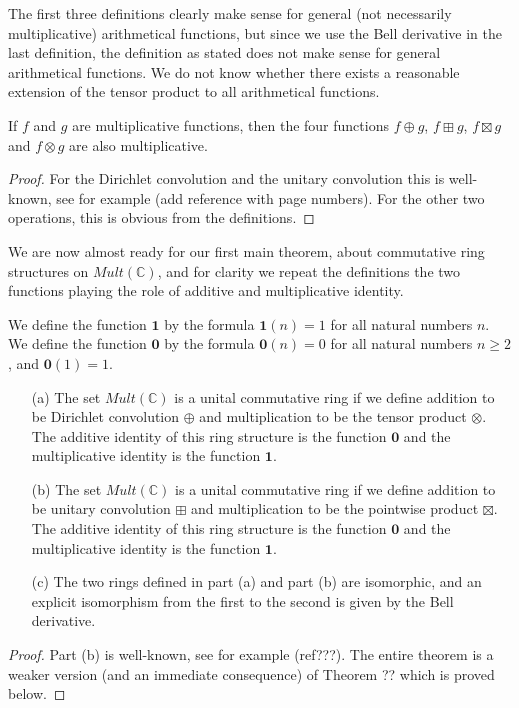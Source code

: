 \documentclass[a4paper]{article}
\begin{document}
\begin{remark}
The first three definitions clearly make sense for general (not necessarily multiplicative) arithmetical functions, but since we use the Bell derivative in the last definition, the definition as stated does not make sense for general arithmetical functions. We do not know whether there exists a reasonable extension of the tensor product to all arithmetical functions.
\end{remark}

\begin{proposition}
If $f$ and $g$ are multiplicative functions, then the four functions $f \oplus g$, $f \boxplus g$, $f \boxtimes g$ and $f \otimes g$ are also multiplicative. 
\end{proposition}

\begin{proof}
For the Dirichlet convolution and the unitary convolution this is well-known, see for example (add reference with page numbers). For the other two operations, this is obvious from the definitions.
\end{proof}

We are now almost ready for our first main theorem, about commutative ring structures on $Mult(\mathbb{C})$, and for clarity we repeat the definitions the two functions playing the role of additive and multiplicative identity.

\begin{definition}
We define the function $\mathbf{1}$ by the formula $\mathbf{1}(n) = 1$ for all natural numbers $n$. We define the function $\mathbf{0}$ by the formula $\mathbf{0}(n) = 0$ for all natural numbers $n \geq 2$, and $\mathbf{0}(1) = 1$.
\end{definition}



\begin{theorem}
\begin{itemize}
\item[(a)] The set $Mult(\mathbb{C})$ is a unital commutative ring if we define addition to be Dirichlet convolution $\oplus$ and multiplication to be the tensor product $\otimes$. The additive identity of this ring structure is the function $\mathbf{0}$ and the multiplicative identity is the function $\mathbf{1}$. 
\item[(b)] The set $Mult(\mathbb{C})$ is a unital commutative ring if we define addition to be unitary convolution $\boxplus$ and multiplication to be the pointwise product $\boxtimes$. The additive identity of this ring structure is the function $\mathbf{0}$ and the multiplicative identity is the function $\mathbf{1}$.
\item[(c)] The two rings defined in part (a) and part (b) are isomorphic, and an explicit isomorphism from the first to the second is given by the Bell derivative. 
\end{itemize}
\end{theorem}
\begin{proof}
Part (b) is well-known, see for example (ref???). The entire theorem is a weaker version (and an immediate consequence) of Theorem ?? which is proved below.
\end{proof}
\end{document}
